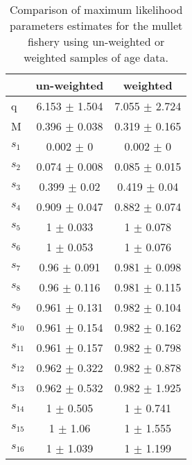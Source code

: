 \begin{table}[ht]
\centering
\begin{tabular}{lcc}
  \hline
 & un-weighted & weighted \\ 
  \hline
q & 6.153 $\pm$ 1.504 & 7.055 $\pm$ 2.724 \\ 
  M & 0.396 $\pm$ 0.038 & 0.319 $\pm$ 0.165 \\ 
  $s_{1}$ & 0.002 $\pm$ 0 & 0.002 $\pm$ 0 \\ 
  $s_{2}$ & 0.074 $\pm$ 0.008 & 0.085 $\pm$ 0.015 \\ 
  $s_{3}$ & 0.399 $\pm$ 0.02 & 0.419 $\pm$ 0.04 \\ 
  $s_{4}$ & 0.909 $\pm$ 0.047 & 0.882 $\pm$ 0.074 \\ 
  $s_{5}$ & 1 $\pm$ 0.033 & 1 $\pm$ 0.078 \\ 
  $s_{6}$ & 1 $\pm$ 0.053 & 1 $\pm$ 0.076 \\ 
  $s_{7}$ & 0.96 $\pm$ 0.091 & 0.981 $\pm$ 0.098 \\ 
  $s_{8}$ & 0.96 $\pm$ 0.116 & 0.981 $\pm$ 0.115 \\ 
  $s_{9}$ & 0.961 $\pm$ 0.131 & 0.982 $\pm$ 0.104 \\ 
  $s_{10}$ & 0.961 $\pm$ 0.154 & 0.982 $\pm$ 0.162 \\ 
  $s_{11}$ & 0.961 $\pm$ 0.157 & 0.982 $\pm$ 0.798 \\ 
  $s_{12}$ & 0.962 $\pm$ 0.322 & 0.982 $\pm$ 0.878 \\ 
  $s_{13}$ & 0.962 $\pm$ 0.532 & 0.982 $\pm$ 1.925 \\ 
  $s_{14}$ & 1 $\pm$ 0.505 & 1 $\pm$ 0.741 \\ 
  $s_{15}$ & 1 $\pm$ 1.06 & 1 $\pm$ 1.555 \\ 
  $s_{16}$ & 1 $\pm$ 1.039 & 1 $\pm$ 1.199 \\ 
   \hline
\end{tabular}
\caption{Comparison of maximum likelihood parameters estimates for the mullet fishery using un-weighted or weighted samples of age data.} 
\label{tab:EffectOfWeightingOnMulletEstimates}
\end{table}

